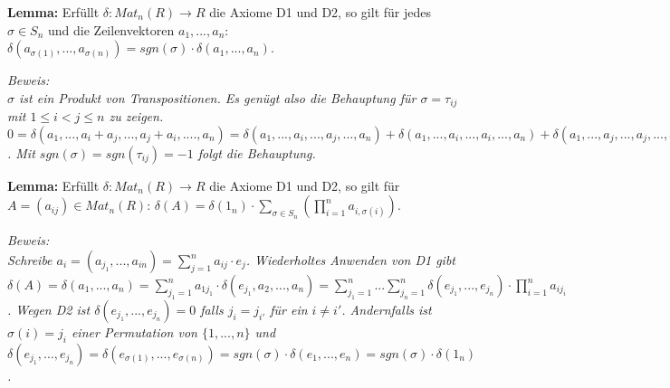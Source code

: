 \documentclass[11pt]{article}
\begin{document}
		\begin{framed}
			\textbf{Lemma:} Erfüllt $\delta:Mat_n(R) \to R$ die Axiome D1 und D2, so gilt für jedes $\sigma\in S_n$ und die Zeilenvektoren 
			$a_1,...,a_n$: $\delta(a_{\sigma(1)},...,a_{\sigma(n)})=sgn(\sigma)\cdot \delta(a_1,...,a_n)$.
		\end{framed}
		\textit{Beweis: \\
		$\sigma$ ist ein Produkt von Transpositionen. Es genügt also die Behauptung für $\sigma=\tau_{ij}$ mit $1\le i<j\le n$ zu zeigen. \\
		$0=\delta(a_1,...,a_i+a_j,...,a_j+a_i,....,a_n)=\delta(a_1,...,a_i,...,a_j,...,a_n)+\delta(a_1,...,a_i,...,a_i,...,a_n)+\delta(a_1,...,a_j,
		...,a_j,...,a_n)+\delta{a_1,...,a_j,...,a_i,...,a_n}=\delta(a_1,...,a_n)+\delta(a_{\sigma(1)},...,a_{\sigma(n)})=0$. Mit $sgn(\sigma)=
		sgn(\tau_{ij})=-1$ folgt die Behauptung.}
		
		\begin{framed}
			\textbf{Lemma:} Erfüllt $\delta:Mat_n(R)\to R$ die Axiome D1 und D2, so gilt für $A=(a_{ij})\in Mat_n(R)$: $\delta(A)=\delta(1_n)
			\cdot \sum\limits_{\sigma\in S_n} \left( \prod\limits_{i=1}^n a_{i,\sigma(i)} \right)$.
		\end{framed}
		\textit{Beweis: \\
		Schreibe $a_i=(a_{j_1},...,a_{in})=\sum\limits_{j=1}^n a_{ij}\cdot e_j$. Wiederholtes Anwenden von D1 gibt $\delta(A)=\delta(
		a_1,...,a_n)=\sum\limits_{j_1=1}^n a_{1j_1}\cdot \delta(e_{j_1},a_2,...,a_n)=\sum\limits_{j_1=1}^n ... \sum\limits_{j_n=1}^n \delta(
		e_{j_1},...,e_{j_n})\cdot \prod\limits_{i=1}^n a_{ij_i}$. Wegen D2 ist $\delta(e_{j_1},...,e_{j_n})=0$ falls $j_i=j_{i'}$ für ein $i\neq i'$. 
		Andernfalls ist $\sigma(i)=j_i$ einer Permutation von $\{1,...,n\}$ und $\delta(e_{j_1},...,e_{j_n})=\delta(e_{\sigma(1)},...,e_{\sigma(n)})=
		sgn(\sigma)\cdot \delta(e_1,...,e_n)=sgn(\sigma)\cdot \delta(1_n)$.}
		
\end{document}
